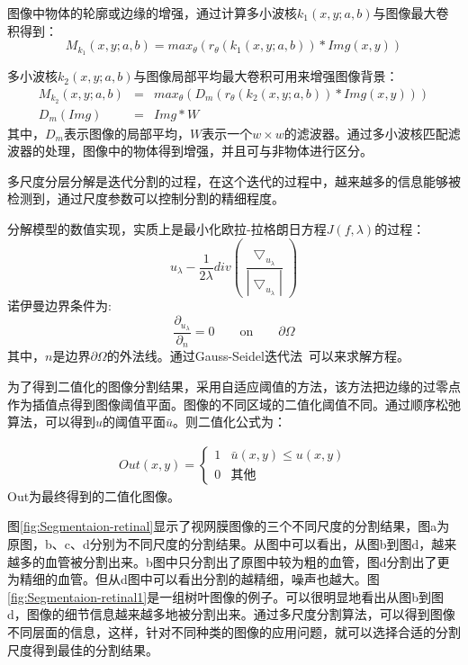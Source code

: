 图像中物体的轮廓或边缘的增强，通过计算多小波核$k_1(x,y;a,b)$与图像最大卷积得到：
\begin{equation}
M_{k_1}(x,y;a,b) = max_\theta(r_\theta(k_1(x,y;a,b)) \ast Img(x,y))
\end{equation} 

多小波核$k_2(x,y;a,b)$与图像局部平均最大卷积可用来增强图像背景：
\begin{eqnarray}
M_{k_2}(x,y;a,b) &=& max_\theta(D_m(r_\theta(k_2(x,y;a,b)) \ast Img(x,y)))\\
D_m(Img) &=& Img\ast W
\end{eqnarray} 
其中，$D_m$表示图像的局部平均，$W$表示一个$w \times w$的滤波器。通过多小波核匹配滤波器的处理，图像中的物体得到增强，并且可与非物体进行区分。

多尺度分层分解是迭代分割的过程，在这个迭代的过程中，越来越多的信息能够被检测到，通过尺度参数可以控制分割的精细程度。

分解模型的数值实现，实质上是最小化欧拉-拉格朗日方程$J(f,\lambda)$的过程：
\begin{equation}
u_\lambda - \frac{1}{2\lambda}div(\frac{\bigtriangledown_{u_\lambda}}{|\bigtriangledown_{u_\lambda}|})
\end{equation}
诺伊曼边界条件为:
\begin{equation}
\frac{\partial_{u_\lambda}}{\partial_n} = 0 \qquad \textrm{on} \qquad \partial \Omega
\end{equation}
其中，$n$是边界$\partial \Omega$的外法线。通过Gauss-Seidel迭代法~\cite{tadmor,nezzar}可以来求解方程。

为了得到二值化的图像分割结果，采用自适应阈值的方法，该方法把边缘的过零点作为插值点得到图像阈值平面。图像的不同区域的二值化阈值不同。通过顺序松弛算法，可以得到$u$的阈值平面$\bar{u}$。则二值化公式为：

\begin{align}
Out(x,y) = \left\{ \begin{array}{ll}
1 & \bar{u}(x,y)\leq u(x,y)\\
0 & \textrm{其他}
\end{array} \right.
\end{align}
Out为最终得到的二值化图像。

图\ref{fig:Segmentaion-retinal}显示了视网膜图像的三个不同尺度的分割结果，图a为原图，b、c、d分别为不同尺度的分割结果。从图中可以看出，从图b到图d，越来越多的血管被分割出来。b图中只分割出了原图中较为粗的血管，图d分割出了更为精细的血管。但从d图中可以看出分割的越精细，噪声也越大。图\ref{fig:Segmentaion-retinal1}是一组树叶图像的例子。可以很明显地看出从图b到图d，图像的细节信息越来越多地被分割出来。通过多尺度分割算法，可以得到图像不同层面的信息，这样，针对不同种类的图像的应用问题，就可以选择合适的分割尺度得到最佳的分割结果。

